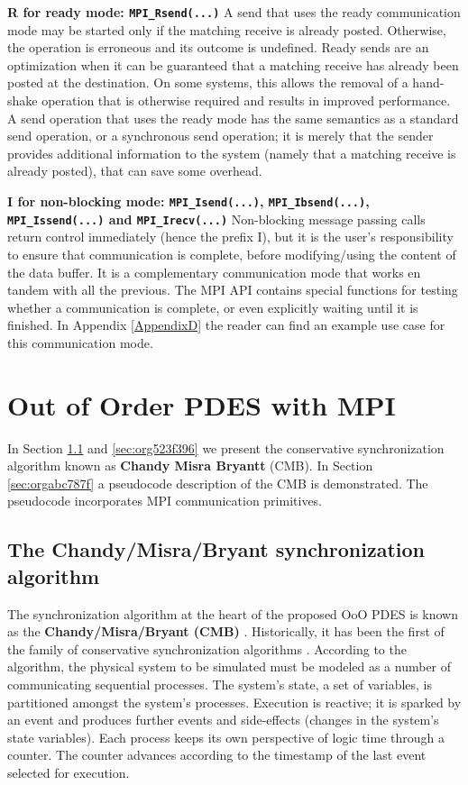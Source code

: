 \documentclass[11pt]{article}
\begin{document}
\textbf{R for ready mode: \texttt{MPI\_Rsend(...)}}
A send that uses the ready communication mode may be started only if the matching receive is already posted. 
Otherwise, the operation is erroneous and its outcome is undefined.
Ready sends are an optimization when it can be guaranteed that a matching receive has already been posted at the destination.
On some systems, this allows the removal of a hand-shake operation that is otherwise required and results in improved performance. 
A send operation that uses the ready mode has the same semantics as a standard send operation, or a synchronous send operation; 
it is merely that the sender provides additional information to the system (namely that a matching receive is already posted), that can save some overhead. 

\textbf{I for non-blocking mode: \texttt{MPI\_Isend(...)}, \texttt{MPI\_Ibsend(...)}, \texttt{MPI\_Issend(...)} and \texttt{MPI\_Irecv(...)}}
Non-blocking message passing calls return control immediately (hence the prefix I), 
but it is the user's responsibility to ensure that communication is complete, 
before modifying/using the content of the data buffer.
It is a complementary communication mode that works en tandem with all the previous.
The MPI API contains special functions for testing whether a communication is complete, or even explicitly waiting until it is finished.
In Appendix \ref{AppendixD} the reader can find an example use case for this communication mode.


\clearpage

\section{Out of Order PDES with MPI}
\label{sec:orgb31ffb7}
In Section \ref{sec:org2ce1d5c} and \ref{sec:org523f396} we present the conservative synchronization algorithm known as \textbf{Chandy Misra Bryantt} (CMB).
In Section \ref{sec:orgabc787f} a pseudocode description of the CMB is demonstrated. The pseudocode incorporates MPI communication primitives.

\subsection{The Chandy/Misra/Bryant synchronization algorithm}
\label{sec:org2ce1d5c}
The synchronization algorithm at the heart of the proposed OoO PDES is known as the \textbf{Chandy/Misra/Bryant (CMB)} \cite{Bryant} \cite{Chandy1979}.
Historically, it has been the first of the family of conservative synchronization algorithms \cite{Fujimoto1990}.
According to the algorithm, the physical system to be simulated must be modeled as a number of communicating sequential processes.
The system's state, a set of variables, is partitioned amongst the system's processes.
Execution is reactive; it is sparked by an event and produces further events and side-effects (changes in the system's state variables).
Each process keeps its own perspective of logic time through a counter.
The counter advances according to the timestamp of the last event selected for execution.
\end{document}
